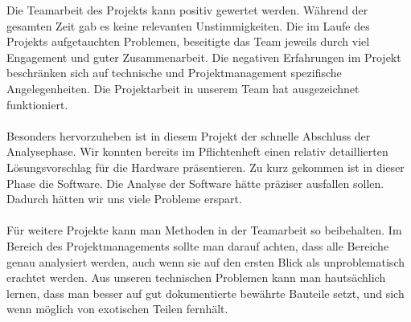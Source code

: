 Die Teamarbeit des Projekts kann positiv gewertet werden. Während der gesamten Zeit gab es keine relevanten Unstimmigkeiten. Die im Laufe des Projekts aufgetauchten Problemen, beseitigte das Team jeweils durch viel Engagement und guter Zusammenarbeit. Die negativen Erfahrungen im Projekt beschränken sich auf technische und Projektmanagement spezifische Angelegenheiten. Die Projektarbeit in unserem Team hat ausgezeichnet funktioniert.\\
\\
Besonders hervorzuheben ist in diesem Projekt der schnelle Abschluss der Analysephase. Wir konnten bereits im Pflichtenheft einen relativ detaillierten Lösungsvorschlag für die Hardware präsentieren. Zu kurz gekommen ist in dieser Phase die Software. Die Analyse der Software hätte präziser ausfallen sollen. Dadurch hätten wir uns viele Probleme erspart.\\
\\
Für weitere Projekte kann man Methoden in der Teamarbeit so beibehalten. Im Bereich des Projektmanagements sollte man darauf achten, dass alle Bereiche genau analysiert werden, auch wenn sie auf den ersten Blick als unproblematisch erachtet werden. Aus unseren technischen Problemen kann man hautsächlich lernen, dass man besser auf gut dokumentierte bewährte Bauteile setzt, und sich wenn möglich von exotischen Teilen fernhält.